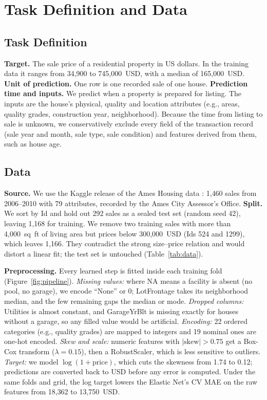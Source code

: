 \section{Task Definition and Data}
\label{sec:data}

\subsection{Task Definition}
\textbf{Target.} The sale price of a residential property in US dollars.
In the training data it ranges from 34{,}900 to 745{,}000~USD, with a median of 165{,}000~USD.
\textbf{Unit of prediction.} One row is one recorded sale of one house.
\textbf{Prediction time and inputs.} We predict when a property is prepared for listing.
The inputs are the house's physical, quality and location attributes (e.g., areas, quality grades, construction year, neighborhood).
Because the time from listing to sale is unknown, we conservatively exclude every field of the transaction record (sale year and month, sale type, sale condition) and features derived from them, such as house age.

\subsection{Data}
\textbf{Source.} We use the Kaggle release \citep{kaggle2016house} of the Ames Housing data \citep{decock2011ames}: 1{,}460 sales from 2006--2010 with 79 attributes, recorded by the Ames City Assessor's Office.
\textbf{Split.} We sort by Id and hold out 292 sales as a sealed test set (random seed 42), leaving 1{,}168 for training.
We remove two training sales with more than 4{,}000~sq~ft of living area but prices below 300{,}000~USD (Ids 524 and 1299), which leaves 1{,}166.
They contradict the strong size--price relation and would distort a linear fit; the test set is untouched (Table~\ref{tab:data}).

\textbf{Preprocessing.} Every learned step is fitted inside each training fold (Figure~\ref{fig:pipeline}).
\emph{Missing values:} where NA means a facility is absent (no pool, no garage), we encode ``None'' or 0; LotFrontage takes its neighborhood median, and the few remaining gaps the median or mode.
\emph{Dropped columns:} Utilities is almost constant, and GarageYrBlt is missing exactly for houses without a garage, so any filled value would be artificial.
\emph{Encoding:} 22 ordered categories (e.g., quality grades) are mapped to integers and 19 nominal ones are one-hot encoded.
\emph{Skew and scale:} numeric features with $|\text{skew}| > 0.75$ get a Box-Cox transform ($\lambda = 0.15$), then a RobustScaler, which is less sensitive to outliers.
\emph{Target:} we model $\log(1+\text{price})$, which cuts the skewness from 1.74 to 0.12; predictions are converted back to USD before any error is computed.
Under the same folds and grid, the log target lowers the Elastic Net's CV MAE on the raw features from 18{,}362 to 13{,}750~USD.

